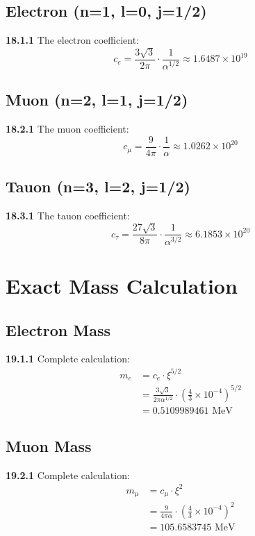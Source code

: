 \documentclass[12pt,a4paper]{article}
\begin{document}
\subsection{Electron (n=1, l=0, j=1/2)}
\noindent \textbf{18.1.1} The electron coefficient:
\begin{equation}
	c_e = \frac{3\sqrt{3}}{2\pi} \cdot \frac{1}{\alpha^{1/2}} \approx 1.6487 \times 10^{19}
\end{equation}

\subsection{Muon (n=2, l=1, j=1/2)}
\noindent \textbf{18.2.1} The muon coefficient:
\begin{equation}
	c_\mu = \frac{9}{4\pi} \cdot \frac{1}{\alpha} \approx 1.0262 \times 10^{20}
\end{equation}

\subsection{Tauon (n=3, l=2, j=1/2)}
\noindent \textbf{18.3.1} The tauon coefficient:
\begin{equation}
	c_\tau = \frac{27\sqrt{3}}{8\pi} \cdot \frac{1}{\alpha^{3/2}} \approx 6.1853 \times 10^{20}
\end{equation}

\section{Exact Mass Calculation}

\subsection{Electron Mass}
\noindent \textbf{19.1.1} Complete calculation:
\begin{align}
	m_e &= c_e \cdot \xi^{5/2} \\
	&= \frac{3\sqrt{3}}{2\pi\alpha^{1/2}} \cdot \left(\frac{4}{3} \times 10^{-4}\right)^{5/2} \\
	&= 0.5109989461 \text{ MeV}
\end{align}

\subsection{Muon Mass}
\noindent \textbf{19.2.1} Complete calculation:
\begin{align}
	m_\mu &= c_\mu \cdot \xi^2 \\
	&= \frac{9}{4\pi\alpha} \cdot \left(\frac{4}{3} \times 10^{-4}\right)^2 \\
	&= 105.6583745 \text{ MeV}
\end{align}
\end{document}
